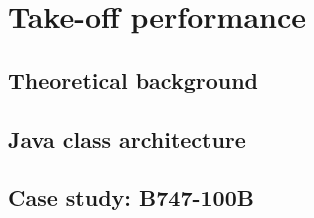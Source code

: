 \chapter{Take-off performance}
\section{Theoretical background}
\section{Java class architecture}
\section{Case study: B747-100B}
